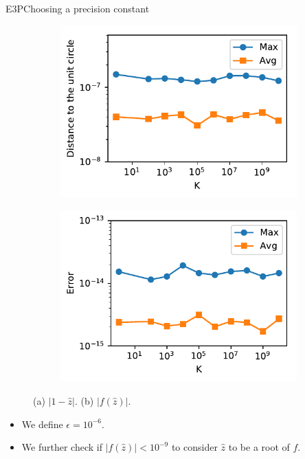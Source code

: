 \documentclass{beamer}
\theoremstyle{definition}
\begin{document}
\begin{frame}{E3P}{Choosing a precision constant}
	\begin{figure}[!htb]
		
		\begin{subfigure}{.44\textwidth}
			\centering
			
			\includegraphics[scale=.53]{../article/figures/e3p_known_sols2}
			\caption{}
			\label{fig:e3p_known_sols2}
		\end{subfigure}
		\begin{subfigure}{.44\textwidth}
			\centering
			
			\includegraphics[scale=.53]{../article/figures/e3p_known_sols1}
			\caption{}
			\label{fig:e3p_known_sols1}
		\end{subfigure}
		\caption{(a) $|1-\hat{z}|$. (b) $|f(\hat{z})|$.}
	\end{figure}

\begin{itemize}
	\item We define $\epsilon = 10^{-6}$.
	\item We further check if $|f(\hat{z})| < 10^{-9}$ to consider $\hat{z}$ to be a root of $f$.
\end{itemize}
\end{frame}
\end{document}

